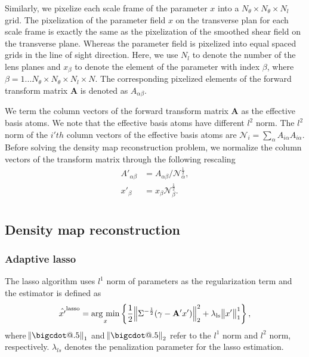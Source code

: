 \documentclass[twocolumn]{aastex62}
\makeatletter
\newcommand*\bigcdot{\mathpalette\bigcdot@{.5}}
\newcommand*\bigcdot@[2]{\mathbin{\vcenter{\hbox{\scalebox{#2}{$\m@th#1\bullet$}}}}}
\newcommand{\argmin}{\mathop{\rm arg~min}\limits}
\makeatother
\begin{document}
Similarly, we pixelize each scale frame of the parameter $x$ into a $N_\theta \times N_\theta \times N_l$ grid.
The pixelization of the parameter field $x$ on the transverse plan for each scale frame is exactly the same as the
pixelization of the smoothed shear field on the transverse plane. Whereas the parameter field is pixelized into equal
spaced grids in the line of sight direction. Here, we use $N_l$ to denote the number of the lens planes and $x_{\beta}$ to
denote the element of the parameter with index $\beta$, where $\beta=1...N_\theta \times N_\theta \times N_l \times N$.
The corresponding pixelized elements of the forward transform matrix $\mathbf{A}$ is denoted as $A_{\alpha\beta}$.

We term the column vectors of the forward transform matrix $\mathbf{A}$ as the effective basis atoms. We note that the
effective basis atoms have different $l^2$ norm. The $l^2$ norm of the $i'th$ column vectors of the effective basis atoms are
$\mathcal{N}_{i}=\sum_\alpha A_{i\alpha}A_{i\alpha}$. Before solving the density map reconstruction problem, we normalize
the column
vectors of the transform matrix through the following rescaling
\begin{equation}
\begin{split}
A'_{\alpha\beta}&=A_{\alpha\beta}/\mathcal{N}_{\alpha}^{\frac{1}{2}},\\
x'_{\beta}&=x_{\beta}\mathcal{N}_{\beta}^{\frac{1}{2}}.\\
\end{split}
\end{equation}

\subsection{Density map reconstruction}
\label{subsec:method-reconstruction}

\subsubsection{Adaptive lasso}

The lasso algorithm uses $l^1$ norm of parameters as the regularization term and the estimator is defined as
\begin{equation}
\hat{x'}^{\rm{lasso}}=\argmin_{x} \left\{ \frac{1}{2}\norm{\Sigma^{-\frac{1}{2}}(\gamma- \mathbf{A'} x')}_2^2+ \lambda_{\rm{ls}} \norm{x'}^1_1\right\},
\end{equation}
where $\norm{\bigcdot}_1$ and $\norm{\bigcdot}_2$ refer to the $l^1$ norm and $l^2$ norm, respectively.
$\lambda_{ls}$ denotes the penalization parameter for the lasso estimation.
\end{document}
